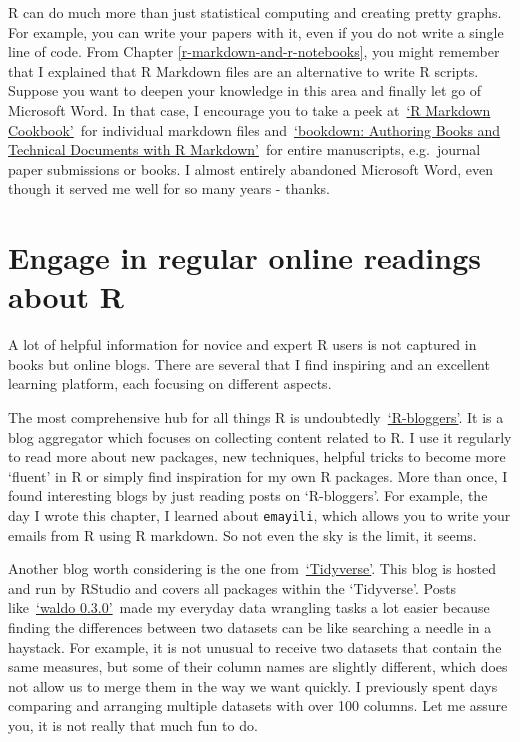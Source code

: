 \documentclass[
]{book}
\begin{document}
R can do much more than just statistical computing and creating pretty graphs. For example, you can write your papers with it, even if you do not write a single line of code. From Chapter \ref{r-markdown-and-r-notebooks}, you might remember that I explained that R Markdown files are an alternative to write R scripts. Suppose you want to deepen your knowledge in this area and finally let go of Microsoft Word. In that case, I encourage you to take a peek at~\href{https://bookdown.org/yihui/rmarkdown-cookbook/}{`R Markdown Cookbook'}~for individual markdown files and~\href{https://bookdown.org/yihui/bookdown/}{`bookdown: Authoring Books and Technical Documents with R Markdown'}~for entire manuscripts, e.g.~journal paper submissions or books. I almost entirely abandoned Microsoft Word, even though it served me well for so many years - thanks.

\hypertarget{engage-in-regular-online-readings-about-r}{%
\section{Engage in regular online readings about R}\label{engage-in-regular-online-readings-about-r}}

A lot of helpful information for novice and expert R users is not captured in books but online blogs. There are several that I find inspiring and an excellent learning platform, each focusing on different aspects.

The most comprehensive hub for all things R is undoubtedly~\href{https://www.r-bloggers.com}{`R-bloggers'}. It is a blog aggregator which focuses on collecting content related to R. I use it regularly to read more about new packages, new techniques, helpful tricks to become more `fluent' in R or simply find inspiration for my own R packages. More than once, I found interesting blogs by just reading posts on `R-bloggers'. For example, the day I wrote this chapter, I learned about \texttt{emayili}, which allows you to write your emails from R using R markdown. So not even the sky is the limit, it seems.

Another blog worth considering is the one from~\href{https://www.tidyverse.org/blog/}{`Tidyverse'}. This blog is hosted and run by RStudio and covers all packages within the `Tidyverse'. Posts like~\href{https://www.tidyverse.org/blog/2021/08/waldo-0-3-0/}{`waldo 0.3.0'}~made my everyday data wrangling tasks a lot easier because finding the differences between two datasets can be like searching a needle in a haystack. For example, it is not unusual to receive two datasets that contain the same measures, but some of their column names are slightly different, which does not allow us to merge them in the way we want quickly. I previously spent days comparing and arranging multiple datasets with over 100 columns. Let me assure you, it is not really that much fun to do.
\end{document}
